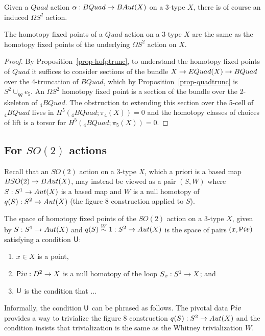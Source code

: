 \documentclass{amsart}
\begin{document}
Given a $Quad$ action $\alpha: BQuad \rightarrow BAut(X)$ on a 3-type $X$, there is of course an induced $\Omega S^2$ action.

\begin{proposition} \label{prop-quadvs2fp}
The homotopy fixed points of a $Quad$ action on a 3-type $X$ are the same as the homotopy fixed points of the underlying $\Omega S^2$ action on $X$.
\end{proposition}
\begin{proof}
By Proposition~\ref{prop-hofptrunc}, to understand the homotopy fixed points of $Quad$ it suffices to consider sections of the bundle $X \rightarrow EQuad(X) \rightarrow BQuad$ over the 4-truncation of $BQuad$, which by Proposition~\ref{prop-quadtrunc} is $S^2 \cup_{\eta q} e_5$.  An $\Omega S^2$ homotopy fixed point is a section of the bundle over the 2-skeleton of ${}_4 BQuad$.  The obstruction to extending this section over the 5-cell of ${}_4 BQuad$ lives in $H^5({}_4 BQuad;\pi_4(X)) = 0$ and the homotopy classes of choices of lift is a torsor for $H^5({}_4 BQuad;\pi_5(X)) = 0$.
\end{proof}


\subsection{For $SO(2)$ actions}

Recall that an $SO(2)$ action on a 3-type $X$, which a priori is a based map $BSO(2) \rightarrow BAut(X)$, may instead be viewed as a pair $(S,W)$ where $S : S^1 \rightarrow Aut(X)$ is a based map and $W$ is a null homotopy of $q(S): S^2 \to Aut(X)$ (the figure 8 construction applied to $S$).

\begin{proposition}
The space of homotopy fixed points of the $SO(2)$ action on a 3-type $X$, given by $S: S^1 \rightarrow Aut(X)$ and $q(S) \overset{W}{\sim} 1 : S^2 \to Aut(X)$ is the space of pairs $(x,\mathsf Piv)$ satisfying a condition $\mathsf U$:
\begin{enumerate}
\item $x \in X$ is a point,
\item $\mathsf Piv: D^2 \rightarrow X$ is a null homotopy of the loop $S_x: S^1 \rightarrow X$; and
\item $\mathsf U$ is the condition that ...

\end{enumerate}
\end{proposition}

Informally, the condition $\mathsf U$ can be phrased as follows. The pivotal data $\mathsf Piv$ provides a way to trivialize the figure 8 construction $q(S) : S^2 \to Aut(X)$ and the condition insists that trivialization is the same as the Whitney trivialization $W$.
\end{document}
